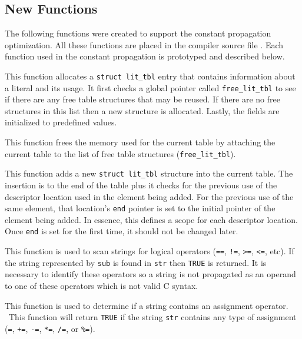 \subsection{New Functions}

The following functions were created to support the constant
propagation optimization. All these functions are placed in the
compiler source file . Each function used in the
constant propagation is prototyped and described below.


This function allocates a \texttt{struct lit\_tbl} entry that contains
information about a literal and its usage. It first checks a global
pointer called \texttt{free\_lit\_tbl} to see if there are any free
table structures that may be reused. If there are no free structures
in this list then a new structure is allocated. Lastly, the fields are
initialized to predefined values.


This function frees the memory used for the current table by attaching
the current table to the list of free table structures
(\texttt{free\_lit\_tbl}).


This function adds a new \texttt{struct lit\_tbl} structure into the current
table. The insertion is to the end of the table plus it checks for the
previous use of the descriptor location used in the element being
added. For the previous use of the same element, that location's
\texttt{end} pointer is set to the initial pointer of the element
being added. In essence, this defines a scope for each descriptor
location. Once \texttt{end} is set for the first time, it should not
be changed later.


This function is used to scan strings for logical operators
(\texttt{==}, \texttt{!=}, \texttt{{\textgreater}=},
\texttt{{\textless}=}, etc). If the string represented by \texttt{sub}
is found in \texttt{str} then \texttt{TRUE} is returned. It is
necessary to identify these operators so a string is not propagated as
an operand to one of these operators which is not valid C syntax.


This function is used to determine if a string contains an assignment
operator. \ This function will return \texttt{TRUE} if the string
\texttt{str} contains any type of assignment (\texttt{=}, \texttt{+=},
\texttt{{}-=}, \texttt{*=}, \texttt{/=}, or \texttt{\%=}).

